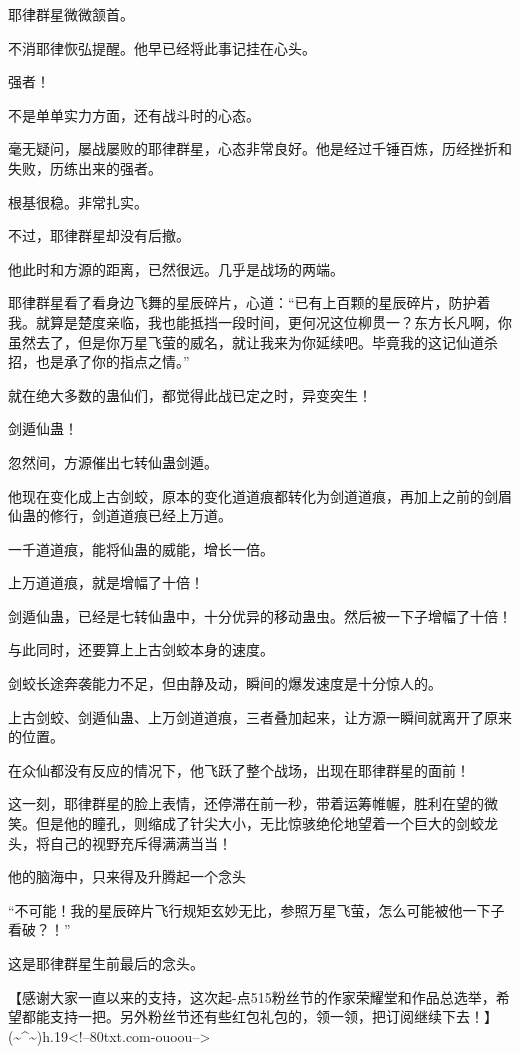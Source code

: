 \begin{this_body}
耶律群星微微颔首。

不消耶律恢弘提醒。他早已经将此事记挂在心头。

强者！

不是单单实力方面，还有战斗时的心态。

毫无疑问，屡战屡败的耶律群星，心态非常良好。他是经过千锤百炼，历经挫折和失败，历练出来的强者。

根基很稳。非常扎实。

不过，耶律群星却没有后撤。

他此时和方源的距离，已然很远。几乎是战场的两端。

耶律群星看了看身边飞舞的星辰碎片，心道：“已有上百颗的星辰碎片，防护着我。就算是楚度亲临，我也能抵挡一段时间，更何况这位柳贯一？东方长凡啊，你虽然去了，但是你万星飞萤的威名，就让我来为你延续吧。毕竟我的这记仙道杀招，也是承了你的指点之情。”

就在绝大多数的蛊仙们，都觉得此战已定之时，异变突生！

剑遁仙蛊！

忽然间，方源催出七转仙蛊剑遁。

他现在变化成上古剑蛟，原本的变化道道痕都转化为剑道道痕，再加上之前的剑眉仙蛊的修行，剑道道痕已经上万道。

一千道道痕，能将仙蛊的威能，增长一倍。

上万道道痕，就是增幅了十倍！

剑遁仙蛊，已经是七转仙蛊中，十分优异的移动蛊虫。然后被一下子增幅了十倍！

与此同时，还要算上上古剑蛟本身的速度。

剑蛟长途奔袭能力不足，但由静及动，瞬间的爆发速度是十分惊人的。

上古剑蛟、剑遁仙蛊、上万剑道道痕，三者叠加起来，让方源一瞬间就离开了原来的位置。

在众仙都没有反应的情况下，他飞跃了整个战场，出现在耶律群星的面前！

这一刻，耶律群星的脸上表情，还停滞在前一秒，带着运筹帷幄，胜利在望的微笑。但是他的瞳孔，则缩成了针尖大小，无比惊骇绝伦地望着一个巨大的剑蛟龙头，将自己的视野充斥得满满当当！

他的脑海中，只来得及升腾起一个念头

“不可能！我的星辰碎片飞行规矩玄妙无比，参照万星飞萤，怎么可能被他一下子看破？！”

这是耶律群星生前最后的念头。

【感谢大家一直以来的支持，这次起-点515粉丝节的作家荣耀堂和作品总选举，希望都能支持一把。另外粉丝节还有些红包礼包的，领一领，把订阅继续下去！】(\~{}\^{}\~{})h.19<!--80txt.com-ouoou-->

\end{this_body}

